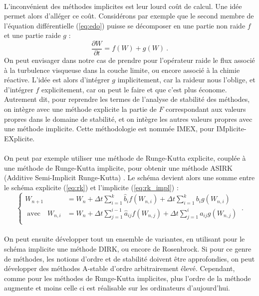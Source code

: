     \paragraph{}
    L’inconvénient des méthodes implicites est leur lourd coût de calcul.
    Une idée permet alors d'alléger ce coût.
    Considérons par exemple que le second membre de l'équation différentielle (\ref{eq:edo}) puisse se décomposer en une partie non raide $f$ et une partie raide $g$ :
    \[\frac{\partial W}{\partial t} = f\left(W\right) + g\left(W\right)\ .\]
    On peut envisager dans notre cas de prendre pour l'opérateur raide le flux associé à la turbulence visqueuse dans la couche limite, ou encore associé à la chimie réactive.
    L'idée est alors d'intégrer $g$ implicitement, car la raideur nous l'oblige, et d'intégrer $f$ explicitement, car on peut le faire et que c'est plus économe.
    Autrement dit, pour reprendre les termes de l'analyse de stabilité des méthodes, on intègre avec une méthode explicite la partie de $F$ correspondant aux valeurs propres dans le domaine de stabilité, et on intègre les autres valeurs propres avec une méthode implicite.
    Cette méthodologie est nommée IMEX, pour IMplicite-EXplicite.

    \paragraph{}
    On peut par exemple utiliser une méthode de Runge-Kutta explicite, couplée à une méthode de Runge-Kutta implicite, pour obtenir une méthode ASIRK (Additive Semi-Implicit Runge-Kutta) \cite{Zhong1996}.
    Le schéma devient alors une somme entre le schéma explicite (\ref{eq:rk}) et l'implicite (\ref{eq:rk_impl}) :
    \[\left\{\begin{aligned}
      W_{n+1} &= W_n + \Delta t\sum_{i = 1}^k\hat{b}_if\left(W_{n,i}\right) + \Delta t\sum_{i = 1}^kb_ig\left(W_{n,i}\right)\\
      \;\textrm{avec}\quad W_{n,i} &= W_n + \Delta t\sum_{j = 1}^{i-1}\hat{a}_{ij}f\left(W_{n,j}\right) + \Delta t\sum_{j = 1}^{i}a_{ij}g\left(W_{n,j}\right) \\
    \end{aligned}\right.\ .\]

    \paragraph{}
    On peut ensuite développer tout un ensemble de variantes, en utilisant pour le schéma implicite une méthode DIRK, ou encore de Rosenbrock.
    Si pour ce genre de méthodes, les notions d'ordre et de stabilité doivent être approfondies, on peut développer des méthodes A-stable d'ordre arbitrairement élevé.
    Cependant, comme pour les méthodes de Runge-Kutta implicites, plus l'ordre de la méthode augmente et moins celle ci est réalisable sur les ordinateurs d'aujourd'hui.

